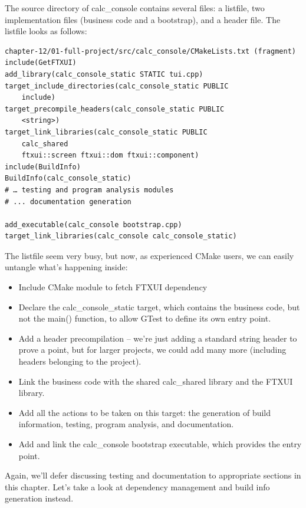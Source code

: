 The source directory of calc\_console contains several files: a listfile, two implementation files (business code and a bootstrap), and a header file. The listfile looks as follows:

\begin{lstlisting}[style=styleCMake]
chapter-12/01-full-project/src/calc_console/CMakeLists.txt (fragment)
include(GetFTXUI)
add_library(calc_console_static STATIC tui.cpp)
target_include_directories(calc_console_static PUBLIC
	include)
target_precompile_headers(calc_console_static PUBLIC
	<string>)
target_link_libraries(calc_console_static PUBLIC
	calc_shared
	ftxui::screen ftxui::dom ftxui::component)
include(BuildInfo)
BuildInfo(calc_console_static)
# … testing and program analysis modules
# ... documentation generation

add_executable(calc_console bootstrap.cpp)
target_link_libraries(calc_console calc_console_static)
\end{lstlisting}

The listfile seem very busy, but now, as experienced CMake users, we can easily untangle what's happening inside:

\begin{itemize}
\item 
Include CMake module to fetch FTXUI dependency

\item 
Declare the calc\_console\_static target, which contains the business code, but not the main() function, to allow GTest to define its own entry point.

\item 
Add a header precompilation – we're just adding a standard string header to prove a point, but for larger projects, we could add many more (including headers belonging to the project).

\item 
Link the business code with the shared calc\_shared library and the FTXUI library.

\item 
Add all the actions to be taken on this target: the generation of build information, testing, program analysis, and documentation.

\item 
Add and link the calc\_console bootstrap executable, which provides the entry point.
\end{itemize}

Again, we'll defer discussing testing and documentation to appropriate sections in this chapter. Let's take a look at dependency management and build info generation instead.


